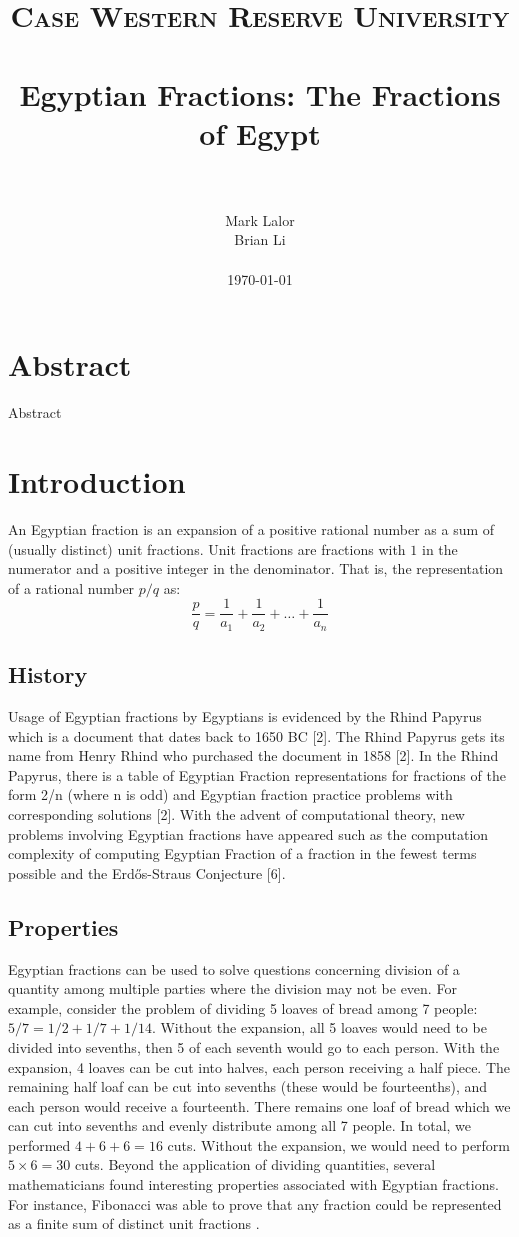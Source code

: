 \documentclass[paper=a4, fontsize=11pt]{scrartcl}
\title{
		\usefont{OT1}{bch}{b}{n}
		\normalfont \normalsize \textsc{Case Western Reserve University} \\ [25pt]
		\horrule{0.5pt} \\[0.4cm]
		\huge Egyptian Fractions: The Fractions of Egypt \\
		\horrule{2pt} \\[0.5cm]
}
\author{
		\normalfont 			\normalsize
        Mark Lalor\\[-3pt]		\normalsize
        Brian Li\\[-3pt]		\normalsize
        \\
        \today
}
\date{}
\numberwithin{equation}{section}	 %
\numberwithin{figure}{section}	 %
\numberwithin{table}{section}	 %
\begin{document}
\maketitle
\section{Abstract}
Abstract
\section{Introduction}
An Egyptian fraction is an expansion of a positive rational number as a sum of (usually distinct) unit fractions. Unit fractions are fractions with $1$ in the numerator and a positive integer in the denominator. That is, the representation of a rational number $p/q$ as:
\begin{equation}
	\frac{p}{q} = \frac{1}{a_1} + \frac{1}{a_2} + \ldots + \frac{1}{a_n}
\end{equation}
\subsection{History}
Usage of Egyptian fractions by Egyptians is evidenced by the Rhind Papyrus which is a document that dates back to 1650 BC [2]. The Rhind Papyrus gets its name from Henry Rhind who purchased the document in 1858 [2]. In the Rhind Papyrus, there is a table of Egyptian Fraction representations for fractions of the form 2/n (where n is odd) and Egyptian fraction practice problems with corresponding solutions [2]. With the advent of computational theory, new problems involving Egyptian fractions have appeared such as the computation complexity of computing Egyptian Fraction of a fraction in the fewest terms possible and the Erd\H{o}s-Straus Conjecture [6].
\subsection{Properties}
Egyptian fractions can be used to solve questions concerning division of a quantity among multiple parties where the division may not be even. For example, consider the problem of dividing 5 loaves of bread among 7 people: $5/7 = 1/2 + 1/7 + 1/14$. Without the expansion, all 5 loaves would need to be divided into sevenths, then 5 of each seventh would go to each person. With the expansion, 4 loaves can be cut into halves, each person receiving a half piece. The remaining half loaf can be cut into sevenths (these would be fourteenths), and each person would receive a fourteenth. There remains one loaf of bread which we can cut into sevenths and evenly distribute among all 7 people. In total, we performed $4 + 6 + 6 = 16$ cuts. Without the expansion, we would need to perform $5 \times 6 = 30$ cuts. Beyond the application of dividing quantities, several mathematicians found interesting properties associated with Egyptian fractions. For instance, Fibonacci was able to prove that any fraction could be represented as a finite sum of distinct unit fractions \cite{dunton}. 
\end{document}
